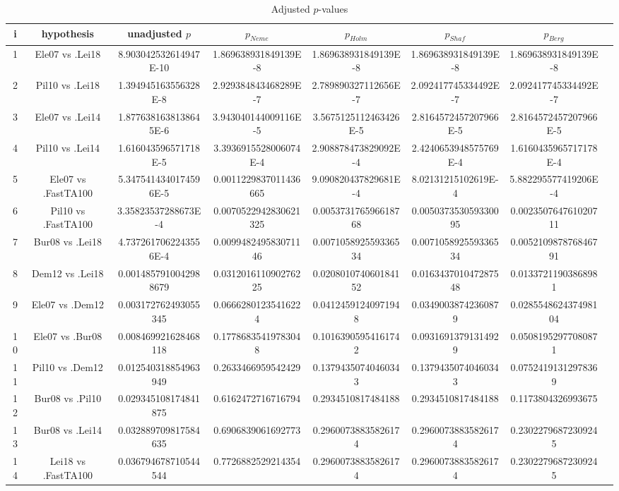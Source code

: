 \documentclass[a4paper,10pt]{article}
\begin{document}
\begin{landscape}
\begin{table}[!htp]
\centering\tiny
\caption{Adjusted $p$-values}
\begin{tabular}{cccccccc}
i&hypothesis&unadjusted $p$&$p_{Neme}$&$p_{Holm}$&$p_{Shaf}$&$p_{Berg}$\\
\hline
1&Ele07 vs .Lei18&8.903042532614947E-10&1.869638931849139E-8&1.869638931849139E-8&1.869638931849139E-8&1.869638931849139E-8\\
2&Pil10 vs .Lei18&1.394945163556328E-8&2.929384843468289E-7&2.789890327112656E-7&2.092417745334492E-7&2.092417745334492E-7\\
3&Ele07 vs .Lei14&1.8776381638138645E-6&3.943040144009116E-5&3.5675125112463426E-5&2.8164572457207966E-5&2.8164572457207966E-5\\
4&Pil10 vs .Lei14&1.616043596571718E-5&3.3936915528006074E-4&2.908878473829092E-4&2.4240653948575769E-4&1.6160435965717178E-4\\
5&Ele07 vs .FastTA100&5.3475414340174596E-5&0.0011229837011436665&9.090820437829681E-4&8.02131215102619E-4&5.882295577419206E-4\\
6&Pil10 vs .FastTA100&3.35823537288673E-4&0.0070522942830621325&0.005373176596618768&0.005037353059330095&0.002350764761020711\\
7&Bur08 vs .Lei18&4.7372617062243556E-4&0.009948249583071146&0.007105892559336534&0.007105892559336534&0.005210987876846791\\
8&Dem12 vs .Lei18&0.0014857910042988679&0.031201611090276225&0.020801074060184152&0.016343701047287548&0.01337211903868981\\
9&Ele07 vs .Dem12&0.003172762493055345&0.06662801235416224&0.04124591240971948&0.03490038742360879&0.028554862437498104\\
10&Ele07 vs .Bur08&0.008469921628468118&0.17786835419783048&0.10163905954161742&0.09316913791314929&0.05081952977080871\\
11&Pil10 vs .Dem12&0.012540318854963949&0.2633466959542429&0.13794350740460343&0.13794350740460343&0.07524191312978369\\
12&Bur08 vs .Pil10&0.029345108174841875&0.6162472716716794&0.2934510817484188&0.2934510817484188&0.1173804326993675\\
13&Bur08 vs .Lei14&0.032889709817584635&0.6906839061692773&0.29600738835826174&0.29600738835826174&0.23022796872309245\\
14&Lei18 vs .FastTA100&0.036794678710544544&0.7726882529214354&0.29600738835826174&0.29600738835826174&0.23022796872309245\\

\end{tabular}
\end{table}
\end{landscape}
\end{document}
